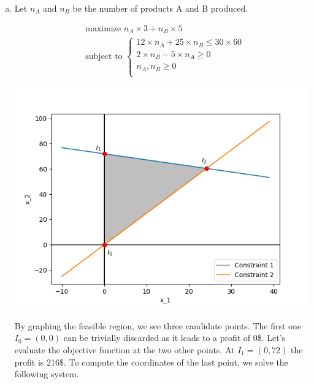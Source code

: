\documentclass[a4paper, 10pt, twoside]{article}
\begin{document}
\begin{enumerate}[a)]
    \item

          Let $n_{A}$ and $n_{B}$ be the number of products A and B produced.

          \begin{align*}
               & \text{maximize } n_{A} \times 3 + n_{B} \times 5 \\
               & \text{subject to }
              \begin{cases}
                  12 \times n_{A} + 25 \times n_{B} \le 30 \times 60 \\
                  2 \times n_{B} - 5 \times n_{A} \ge 0              \\
                  n_{A}, n_{B} \ge 0                                 \\
              \end{cases}
          \end{align*}

          \begin{center}
              \includegraphics[width = .5 \textwidth]{graph1.png}
          \end{center}

          By graphing the feasible region, we see three candidate points. The first one $I_0 = (0, 0)$ can be trivially discarded as it leads to a profit of 0\$. Let's evaluate the objective function at the two other points. At $I_1 = (0, 72)$ the profit is 216\$. To compute the coordinates of the last point, we solve the following system.



\end{enumerate}
\end{document}
